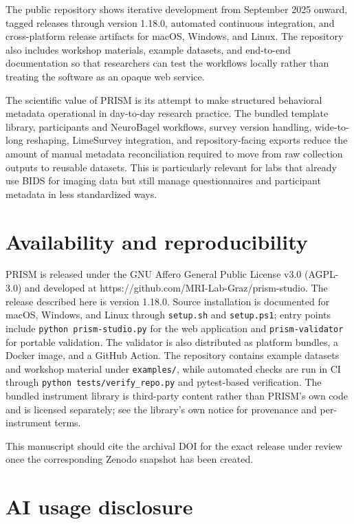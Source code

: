 \documentclass[
]{article}
\begin{document}
The public repository shows iterative development from September 2025
onward, tagged releases through version 1.18.0, automated continuous
integration, and cross-platform release artifacts for macOS, Windows,
and Linux. The repository also includes workshop materials, example
datasets, and end-to-end documentation so that researchers can test the
workflows locally rather than treating the software as an opaque web
service.

The scientific value of PRISM is its attempt to make structured
behavioral metadata operational in day-to-day research practice. The
bundled template library, participants and NeuroBagel workflows, survey
version handling, wide-to-long reshaping, LimeSurvey integration, and
repository-facing exports reduce the amount of manual metadata
reconciliation required to move from raw collection outputs to reusable
datasets. This is particularly relevant for labs that already use BIDS
for imaging data but still manage questionnaires and participant
metadata in less standardized ways.

\section{Availability and
reproducibility}\label{availability-and-reproducibility}

PRISM is released under the GNU Affero General Public License v3.0
(AGPL-3.0) and developed at
https://github.com/MRI-Lab-Graz/prism-studio. The release described here
is version 1.18.0. Source installation is documented for macOS, Windows,
and Linux through \texttt{setup.sh} and \texttt{setup.ps1}; entry points
include \texttt{python\ prism-studio.py} for the web application and
\texttt{prism-validator} for portable validation. The validator is also
distributed as platform bundles, a Docker image, and a GitHub Action.
The repository contains example datasets and workshop material under
\texttt{examples/}, while automated checks are run in CI through
\texttt{python\ tests/verify\_repo.py} and pytest-based verification.
The bundled instrument library is third-party content rather than
PRISM's own code and is licensed separately; see the library's own
notice for provenance and per-instrument terms.

This manuscript should cite the archival DOI for the exact release
under review once the corresponding Zenodo snapshot has been created.

\section{AI usage disclosure}\label{ai-usage-disclosure}
\end{document}
